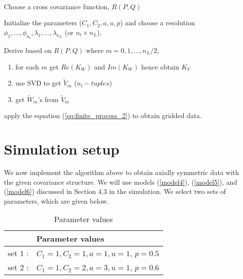 	  \begin{algorithm} \label{pseudo_code}
	  \hfill \\
		\begin{itemize}
		\end{itemize}
	\end{algorithm}
	
	\section{Simulation setup}
We now implement the algorithm above to obtain axially symmetric data with the given covariance structure. We will use models (\ref{model4}), (\ref{model5}), and (\ref{model6}) discussed in Section 4.3 in the simulation. We select two sets of parameters, which are given below.
\begin{table}[H]
\centering
\begin{tabular}{|l|l|}
 \hline
 & Parameter values\\ \hline
set 1 : & $C_1 = 1, C_2 = 1, a = 1, u = 1$, $p=0.5$ \\
set 2 : & $C_1 = 1, C_2 = 2, a = 3, u = 1$, $p=0.6$ \\ \hline
\end{tabular}
\caption{Parameter values }
\end{table}

